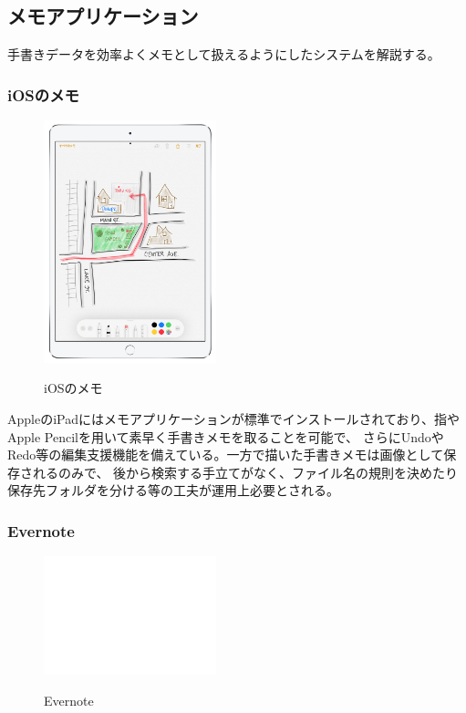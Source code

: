 \subsection{メモアプリケーション}
手書きデータを効率よくメモとして扱えるようにしたシステムを解説する。

\subsubsection{iOSのメモ}

\begin{figure}[htbp]
    \begin{center}
        {\includegraphics[width=50mm]{images/applememo.png}} \end{center}
    \caption{iOSのメモ}
\end{figure}

AppleのiPadにはメモアプリケーションが標準でインストールされており、指やApple Pencilを用いて素早く手書きメモを取ることを可能で、
さらにUndoやRedo等の編集支援機能を備えている。一方で描いた手書きメモは画像として保存されるのみで、
後から検索する手立てがなく、ファイル名の規則を決めたり保存先フォルダを分ける等の工夫が運用上必要とされる。

\subsubsection{Evernote}

\begin{figure}[htbp]
    \begin{center}
    {\includegraphics[width=50mm]{images/testimage.png}} \end{center}
    \caption{Evernote}
\end{figure}


